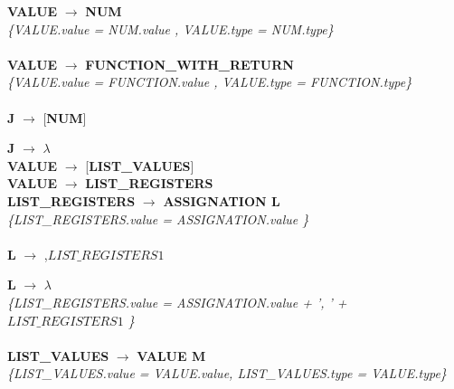 \documentclass[10pt,a4paper]{article}
\begin{document}
\textbf{VALUE} $\rightarrow$ \textbf{NUM}   \\

\textit{\{VALUE.value =  NUM.value , VALUE.type = NUM.type\}}  \\ \\


\textbf{VALUE} $\rightarrow$ \textbf{FUNCTION\_WITH\_RETURN} \\

\textit{\{VALUE.value =  FUNCTION.value , VALUE.type = FUNCTION.type\}}  \\ \\

\textbf{J} $\rightarrow$ [\textbf{NUM}] 

\textbf{J} $\rightarrow$ $\lambda$   \\


\textbf{VALUE} $\rightarrow$ [\textbf{LIST\_VALUES}]   \\


\textbf{VALUE} $\rightarrow$ \textbf{LIST\_REGISTERS} \\




\textbf{LIST\_REGISTERS} $\rightarrow$ \textbf{ASSIGNATION L} \\

\textit{\{LIST\_REGISTERS.value =  ASSIGNATION.value \}}  \\ \\

\textbf{L} $\rightarrow$ ,\textbf{$LIST\_REGISTERS{1}$} 

\textbf{L} $\rightarrow$ $\lambda$\\

\textit{\{LIST\_REGISTERS.value =  ASSIGNATION.value + ', ' + $LIST\_REGISTERS{1}$ \}}  \\ \\



\textbf{LIST\_VALUES} $\rightarrow$ \textbf{VALUE M} \\

\textit{\{LIST\_VALUES.value =  VALUE.value, LIST\_VALUES.type = VALUE.type\}}  \\ \\
\end{document}
